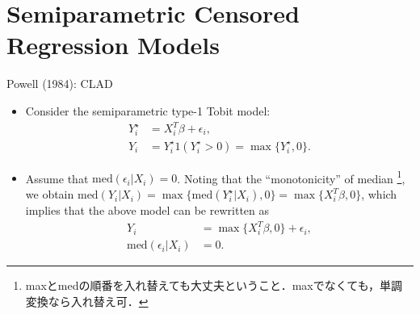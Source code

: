 \documentclass[xcolor=svgnames,dvipdfmx,cjk]{beamer}
\theoremstyle{example}
\def\med{\text{med}}
\begin{document}

\section{Semiparametric Censored Regression Models}

\begin{frame}{Powell (1984): CLAD}
      \begin{itemize}
            \item Consider the semiparametric type-1 Tobit model:
                  \begin{align*}
                        Y_i^{\star} &= X_i^T \beta + \epsilon_i, \\
                        Y_i         &=  Y_i^{\star} 1( Y_i^{\star} > 0) = \max\{Y_i^{\star}, 0\}.
                  \end{align*}
            \item Assume that 
                  $ \med(\epsilon_i|X_i) = 0 $.
                  Noting that the ``monotonicity'' of median
                  \footnote{maxとmedの順番を入れ替えても大丈夫ということ．maxでなくても，単調変換なら入れ替え可．},
                  we obtain 
                  $\med(Y_i|X_i) = \max\{ \med(Y_i^{\star}|X_i), 0\} = \max\{X_i^T\beta, 0\}$,
                  which implies that the above model can be rewritten as
                  \begin{align*}
                        Y_i &= \max\{X_i^T \beta, 0\} + \epsilon_i, \\
                        \med(\epsilon_i|X_i) &= 0.
                  \end{align*}
      \end{itemize}
\end{frame}
\end{document}
